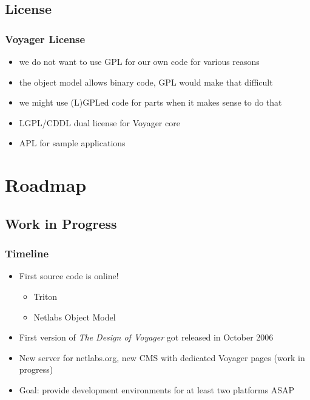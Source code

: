 \documentclass{beamer}
\begin{document}
\subsection{License}

\begin{frame}
\frametitle{Voyager License}
\begin{itemize}[<+->]
  \item we do not want to use GPL for our own code for various reasons
  \item the object model allows binary code, GPL would make that difficult
  \item we might use (L)GPLed code for parts when it makes sense to do that
  \item LGPL/CDDL dual license for Voyager core
  \item APL for sample applications
\end{itemize}
\end{frame}

\section{Roadmap}
\subsection{Work in Progress}

\begin{frame}
\frametitle{Timeline}
\begin{itemize}[<+->]
  \item First source code is online!
  \begin{itemize}[<+->]
    \item Triton
    \item Netlabs Object Model
  \end{itemize}
  \item First version of \textit{The Design of Voyager} got released in October 2006
  \item New server for netlabs.org, new CMS with dedicated Voyager pages (work in progress)
  \item Goal: provide development environments for at least two platforms ASAP
\end{itemize}
\end{frame}
\end{document}
